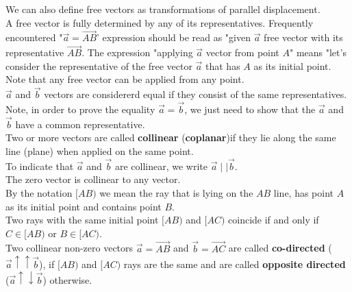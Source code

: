 \documentclass[11pt]{article}
\begin{document}
\noindent We can also define free vectors as transformations of parallel displacement. \\

\noindent A free vector is fully determined by any of its representatives. Frequently encountered "\(\vec{a} = \overrightarrow{AB}\)' expression should be read as "given \(\vec{a}\) free vector with its representative \(\overrightarrow{AB}\). The expression "applying \(\vec{a}\) vector from point \(A\)" means "let's consider the representative of the free vector \(\vec{a}\) that has \(A\) as its initial point.\\

\noindent Note that any free vector can be applied from any point.\\

\noindent \(\vec{a}\) and \(\vec{b}\) vectors are considererd equal if they consist of the same representatives.\\

\noindent Note, in order to prove the equality \(\vec{a} = \vec{b}\), we just need to show that the \(\vec{a}\) and \(\vec{b}\) have a common representative.\\

\noindent Two or more vectors are called \textbf{collinear} (\textbf{coplanar})if they lie along the same line (plane)  when applied on the same point.\\

\noindent To indicate that \(\vec{a}\) and \(\vec{b}\) are collinear, we write \(\vec{a} \mid\mid \vec{b}\).\\

\noindent The zero vector is collinear to any vector.\\

\noindent By the notation \([AB)\) we mean the ray that is lying on the \(AB\) line, has point \(A\) as its initial point and contains point \(B\).\\

\noindent Two rays with the same initial point \([AB)\) and \([AC)\) coincide if and only if \(C \in [AB)\) or \(B \in [AC)\).\\

\noindent Two collinear non-zero vectors \(\vec{a} = \overrightarrow{AB}\) and \(\vec{b} = \overrightarrow{AC}\) are called \textbf{co-directed} (\(\vec{a} \uparrow\uparrow \vec{b}\)), if \([AB)\) and \([AC)\) rays are the same and are called \textbf{opposite directed} (\(\vec{a} \uparrow \downarrow \vec{b}\)) otherwise.\\
\end{document}

